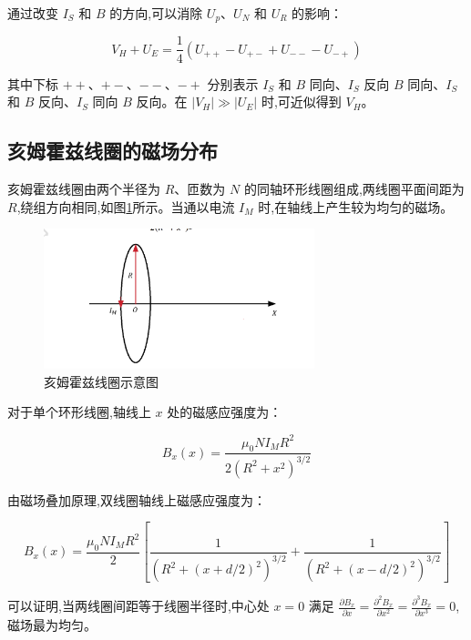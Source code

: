 \documentclass[UTF8]{ctexart}
\begin{document}
    通过改变 $I_S$ 和 $B$ 的方向,可以消除 $U_p$、$U_N$ 和 $U_R$ 的影响：
    
    \begin{equation}
    V_H + U_E = \frac{1}{4}(U_{++} - U_{+-} + U_{--} - U_{-+})  
    \end{equation}
    
    其中下标 $++$、$+-$、$--$、$-+$ 分别表示 $I_S$ 和 $B$ 同向、$I_S$ 反向 $B$ 同向、$I_S$ 和 $B$ 反向、$I_S$ 同向 $B$ 反向。在 $|V_H| \gg |U_E|$ 时,可近似得到 $V_H$。
    
    \subsection{亥姆霍兹线圈的磁场分布}
    
    亥姆霍兹线圈由两个半径为 $R$、匝数为 $N$ 的同轴环形线圈组成,两线圈平面间距为 $R$,绕组方向相同,如图\ref{fig:helmholtz_coil}所示。当通以电流 $I_M$ 时,在轴线上产生较为均匀的磁场。
    
    \begin{figure}[htbp]
    \centering
    \includegraphics[width=0.7\textwidth]{helmholtz_coil.png}
    \caption{亥姆霍兹线圈示意图}
    \label{fig:helmholtz_coil}
    \end{figure}
    
    对于单个环形线圈,轴线上 $x$ 处的磁感应强度为：
    
    \begin{equation}
    B_x(x) = \frac{\mu_0 N I_M R^2}{2(R^2+x^2)^{3/2}}
    \end{equation}
    
    由磁场叠加原理,双线圈轴线上磁感应强度为：
    
    \begin{equation}
    B_x(x) = \frac{\mu_0 N I_M R^2}{2} \left[ \frac{1}{(R^2+(x+d/2)^2)^{3/2}} + \frac{1}{(R^2+(x-d/2)^2)^{3/2}} \right]
    \end{equation}
    
    可以证明,当两线圈间距等于线圈半径时,中心处 $x=0$ 满足 $\frac{\partial B_x}{\partial x}=\frac{\partial^2 B_x}{\partial x^2}=\frac{\partial^3 B_x}{\partial x^3}=0$,磁场最为均匀。
    
\end{document}
